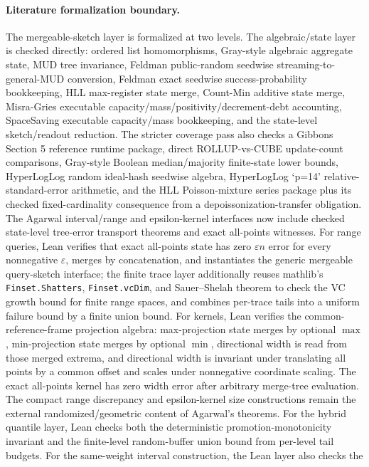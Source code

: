 \paragraph{Literature formalization boundary.} The mergeable-sketch layer is
formalized at two levels. The algebraic/state layer is checked directly:
ordered list homomorphisms, Gray-style algebraic aggregate state, MUD tree
invariance, Feldman public-random seedwise streaming-to-general-MUD conversion,
Feldman exact seedwise success-probability bookkeeping, HLL max-register state
merge, Count-Min additive state merge, Misra-Gries executable
capacity/mass/positivity/decrement-debt accounting, SpaceSaving executable
capacity/mass bookkeeping, and the state-level sketch/readout reduction. The stricter coverage
pass also checks a Gibbons Section 5 reference runtime package, direct
ROLLUP-vs-CUBE update-count comparisons, Gray-style Boolean median/majority
finite-state lower bounds, HyperLogLog random ideal-hash seedwise algebra,
HyperLogLog `p=14' relative-standard-error arithmetic, and the HLL
Poisson-mixture series package plus its checked fixed-cardinality consequence
from a depoissonization-transfer obligation.
The Agarwal interval/range and epsilon-kernel interfaces now include checked
state-level tree-error transport theorems and exact all-points witnesses.  For
range queries, Lean verifies that exact all-points state has zero
\(\varepsilon n\) error for every nonnegative \(\varepsilon\), merges by
concatenation, and instantiates the generic mergeable query-sketch interface;
the finite trace layer additionally reuses mathlib's \texttt{Finset.Shatters},
\texttt{Finset.vcDim}, and Sauer--Shelah theorem to check the VC growth
bound for finite range spaces, and combines per-trace tails into a uniform
failure bound by a finite union bound.
For kernels, Lean verifies the common-reference-frame projection algebra:
max-projection state merges by optional \(\max\), min-projection state merges
by optional \(\min\), directional width is read from those merged extrema, and
directional width is invariant under translating all points by a common offset
and scales under nonnegative coordinate scaling.
The exact all-points
kernel has zero width error after arbitrary merge-tree evaluation.  The compact
range discrepancy and epsilon-kernel size constructions remain the external
randomized/geometric content of Agarwal's theorems.
For the hybrid quantile layer, Lean checks both the deterministic
promotion-monotonicity invariant and the finite-level random-buffer union bound
from per-level tail budgets.
For the same-weight interval construction, the Lean layer also checks the
